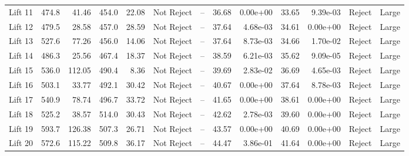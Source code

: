 \begin{tabular}{lrrrrllrrrrll}
 Lift 11 &              474.8 &   41.46 &               454.0 &  22.08 &  Not Reject &          -- &                    36.68 &  0.00e+00 &                     33.65 &  9.39e-03 &  Reject &       Large \\
 Lift 12 &              479.5 &   28.58 &               457.0 &  28.59 &  Not Reject &          -- &                    37.64 &  4.68e-03 &                     34.61 &  0.00e+00 &  Reject &       Large \\
 Lift 13 &              527.6 &   77.26 &               456.0 &  14.06 &  Not Reject &          -- &                    37.64 &  8.73e-03 &                     34.66 &  1.70e-02 &  Reject &       Large \\
 Lift 14 &              486.3 &   25.56 &               467.4 &  18.37 &  Not Reject &          -- &                    38.59 &  6.21e-03 &                     35.62 &  9.09e-05 &  Reject &       Large \\
 Lift 15 &              536.0 &  112.05 &               490.4 &   8.36 &  Not Reject &          -- &                    39.69 &  2.83e-02 &                     36.69 &  4.65e-03 &  Reject &       Large \\
 Lift 16 &              503.1 &   33.77 &               492.1 &  30.42 &  Not Reject &          -- &                    40.67 &  0.00e+00 &                     37.64 &  8.78e-03 &  Reject &       Large \\
 Lift 17 &              540.9 &   78.74 &               496.7 &  33.72 &  Not Reject &          -- &                    41.65 &  0.00e+00 &                     38.61 &  0.00e+00 &  Reject &       Large \\
 Lift 18 &              525.2 &   38.57 &               514.0 &  30.43 &  Not Reject &          -- &                    42.62 &  2.78e-03 &                     39.60 &  0.00e+00 &  Reject &       Large \\
 Lift 19 &              593.7 &  126.38 &               507.3 &  26.71 &  Not Reject &          -- &                    43.57 &  0.00e+00 &                     40.69 &  0.00e+00 &  Reject &       Large \\
 Lift 20 &              572.6 &  115.22 &               509.8 &  36.17 &  Not Reject &          -- &                    44.47 &  3.86e-01 &                     41.64 &  0.00e+00 &  Reject &       Large \\
\bottomrule
\end{tabular}
